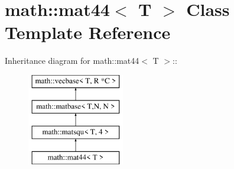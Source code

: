 \hypertarget{classmath_1_1mat44}{
\section{math::mat44$<$ T $>$ Class Template Reference}
\label{classmath_1_1mat44}
}
Inheritance diagram for math::mat44$<$ T $>$::\begin{figure}[H]
\begin{center}
\leavevmode
\includegraphics[height=4cm]{classmath_1_1mat44}
\end{center}
\end{figure}

